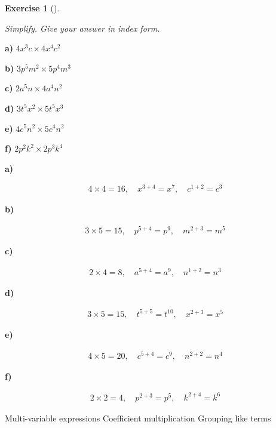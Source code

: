 \documentclass[
  letterpaper,
  DIV=11,
  numbers=noendperiod]{scrreprt}
\theoremstyle{definition}
\newtheorem{exercise}{Exercise}[chapter]
\theoremstyle{remark}
\begin{document}
\begin{exercise}[]\protect\hypertarget{exr-u2-4}{}\label{exr-u2-4}

\emph{Simplify. Give your answer in index form.}

\textbf{a)} \(\displaystyle 4x^{3}c \times 4x^{4}c^{2}\)

\textbf{b)} \(\displaystyle 3p^{5}m^{2} \times 5p^{4}m^{3}\)

\textbf{c)} \(\displaystyle 2a^{5}n \times 4a^{4}n^{2}\)

\textbf{d)} \(\displaystyle 3t^{5}x^{2} \times 5t^{5}x^{3}\)

\textbf{e)} \(\displaystyle 4c^{5}n^{2} \times 5c^{4}n^{2}\)

\textbf{f)} \(\displaystyle 2p^{2}k^{2} \times 2p^{3}k^{4}\)

\begin{tcolorbox}[enhanced jigsaw, opacitybacktitle=0.6, coltitle=black, arc=.35mm, colframe=quarto-callout-tip-color-frame, colback=white, bottomrule=.15mm, left=2mm, colbacktitle=quarto-callout-tip-color!10!white, titlerule=0mm, opacityback=0, title=\textcolor{quarto-callout-tip-color}{\faLightbulb}\hspace{0.5em}{🔍 View Solutions}, leftrule=.75mm, breakable, rightrule=.15mm, bottomtitle=1mm, toptitle=1mm, toprule=.15mm]

\textbf{a)}

\[
\begin{aligned}
4\times 4=16,\quad x^{3+4}=x^{7},\quad c^{1+2}=c^{3}
\end{aligned}
\]

\textbf{b)}

\[
\begin{aligned}
3\times 5=15,\quad p^{5+4}=p^{9},\quad m^{2+3}=m^{5}
\end{aligned}
\]

\textbf{c)}

\[
\begin{aligned}
2\times 4=8,\quad a^{5+4}=a^{9},\quad n^{1+2}=n^{3}
\end{aligned}
\]

\textbf{d)}

\[
\begin{aligned}
3\times 5=15,\quad t^{5+5}=t^{10},\quad x^{2+3}=x^{5}
\end{aligned}
\]

\textbf{e)}

\[
\begin{aligned}
4\times 5=20,\quad c^{5+4}=c^{9},\quad n^{2+2}=n^{4}
\end{aligned}
\]

\textbf{f)}

\[
\begin{aligned}
2\times 2=4,\quad p^{2+3}=p^{5},\quad k^{2+4}=k^{6}
\end{aligned}
\]

\end{tcolorbox}

{Multi-variable expressions} {Coefficient multiplication} {Grouping like
terms}

\end{exercise}
\end{document}
